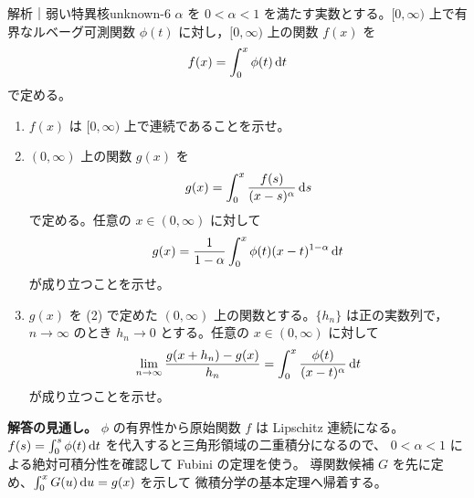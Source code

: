 \begin{problem}{解析｜弱い特異核}{unknown-6}
$\alpha$ を $0<\alpha<1$ を満たす実数とする。$[0,\infty)$ 上で有界なルベーグ可測関数 $\phi(t)$ に対し，$[0,\infty)$ 上の関数 $f(x)$ を
\[
f(x)=\int_0^x\phi(t)\,\mathrm{d} t
\]
で定める。
\begin{enumerate}
  \item[(1)] $f(x)$ は $[0,\infty)$ 上で連続であることを示せ。
  \item[(2)] $(0,\infty)$ 上の関数 $g(x)$ を
  \[
  g(x)=\int_0^x\frac{f(s)}{(x-s)^\alpha}\,\mathrm{d} s
  \]
  で定める。任意の $x\in(0,\infty)$ に対して
  \[
  g(x)=\frac1{1-\alpha}\int_0^x\phi(t)(x-t)^{1-\alpha}\,\mathrm{d} t
  \]
  が成り立つことを示せ。
  \item[(3)] $g(x)$ を (2) で定めた $(0,\infty)$ 上の関数とする。$\{h_n\}$ は正の実数列で，$n\to\infty$ のとき $h_n\to0$ とする。任意の $x\in(0,\infty)$ に対して
  \[
  \lim_{n\to\infty}\frac{g(x+h_n)-g(x)}{h_n}=\int_0^x\frac{\phi(t)}{(x-t)^\alpha}\,\mathrm{d} t
  \]
  が成り立つことを示せ。
\end{enumerate}
\end{problem}
\begin{memo*}
\textbf{解答の見通し。}
$\phi$ の有界性から原始関数 $f$ は Lipschitz 連続になる。
$f(s)=\int_0^s\phi(t)\,\mathrm{d} t$ を代入すると三角形領域の二重積分になるので、
$0<\alpha<1$ による絶対可積分性を確認して Fubini の定理を使う。
導関数候補 $G$ を先に定め、$\int_0^xG(u)\,\mathrm{d} u=g(x)$ を示して
微積分学の基本定理へ帰着する。
\end{memo*}
